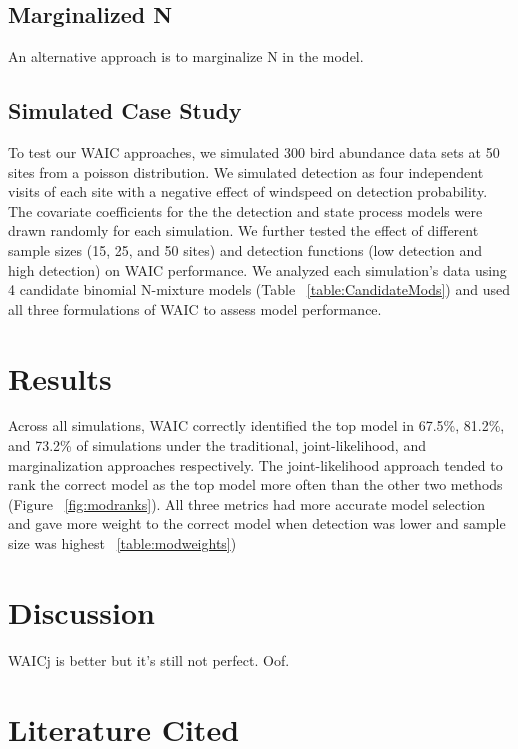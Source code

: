 \documentclass[12pt]{article}
\begin{document}
\subsection{Marginalized N}

An alternative approach is to marginalize N in the model. 

\subsection{Simulated Case Study}

To test our WAIC approaches, we simulated 300 bird abundance data sets at 50 sites from a poisson distribution. We simulated detection as four independent visits of each site with a negative effect of windspeed on detection probability. The covariate coefficients for the  the detection and state process models were drawn randomly for each simulation. We further tested the effect of different sample sizes (15, 25, and 50 sites) and detection functions (low detection and high detection) on WAIC performance.  We analyzed each simulation's data using 4 candidate binomial N-mixture models (Table ~\ref{table:CandidateMods}) and used all three formulations of WAIC to assess model performance. 

\section{Results}
Across all simulations, WAIC correctly identified the top model in  67.5\%, 81.2\%, and 73.2\% of simulations under the traditional, joint-likelihood, and marginalization approaches respectively. The joint-likelihood approach tended to rank the correct model as the top model more often than the other two methods (Figure ~\ref{fig:modranks}).  All three metrics had more accurate model selection and gave more weight to the correct model when detection was lower and sample size was highest ~\ref{table:modweights})


\section{Discussion}
WAICj is better but it's still not perfect. Oof. 

\section{Literature Cited}


\newpage
\end{document}
